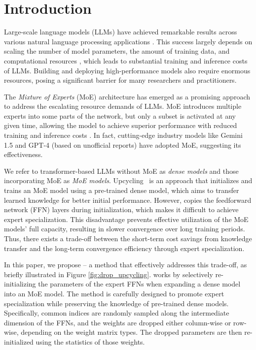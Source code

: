 \section{Introduction}

%
%
Large-scale language models (LLMs) have achieved remarkable results across various natural language processing applications \citep{NEURIPS2020_1457c0d6,wei2022chain,ouyang2022training,openai2024gpt4technicalreport}. This success largely depends on scaling the number of model parameters, the amount of training data, and computational resources \citep{kaplan2020scalinglawsneurallanguage,NEURIPS2022_c1e2faff}, which leads to substantial training and inference costs of LLMs. Building and deploying high-performance models also require enormous resources, posing a significant barrier for many researchers and practitioners.

%
%
The \emph{Mixture of Experts} (MoE) architecture has emerged as a promising approach to address the escalating resource demands of LLMs. MoE introduces multiple experts into some parts of the network, but only a subset is activated at any given time, allowing the model to achieve superior performance with reduced training and inference costs \citep{shazeer2017,lepikhin2021gshard,Fedus2021SwitchTS}. In fact, cutting-edge industry models like Gemini 1.5 \citep{geminiteam2024gemini15unlockingmultimodal} and GPT-4 (based on unofficial reports) \citep{openai2024gpt4technicalreport} have adopted MoE, suggesting its effectiveness. 


%
%
We refer to transformer-based LLMs without MoE as \emph{dense models} and those incorporating MoE as \emph{MoE models}.
Upcycling~\citep{komatsuzaki2023sparse} is an approach that initializes and trains an MoE model using a pre-trained dense model, which aims to transfer learned knowledge for better initial performance.
However, \NUname{} copies the feedforward network (FFN) layers during initialization, which makes it difficult to achieve expert specialization.
This disadvantage prevents effective utilization of the MoE models' full capacity, resulting in slower convergence over long training periods.
Thus, there exists a trade-off between the short-term cost savings from knowledge transfer and the long-term convergence efficiency through expert specialization.



In this paper, we propose \emph{\methodname{}} -- a method that effectively addresses this trade-off, as briefly illustrated in Figure \ref{fig:drop_upcycling}. \methodname{} works by selectively re-initializing the parameters of the expert FFNs when expanding a dense model into an MoE model. The method is carefully designed to promote expert specialization while preserving the knowledge of pre-trained dense models. Specifically, common indices are randomly sampled along the intermediate dimension of the FFNs, and the weights are dropped either column-wise or row-wise, depending on the weight matrix types. The dropped parameters are then re-initialized using the statistics of those weights.



